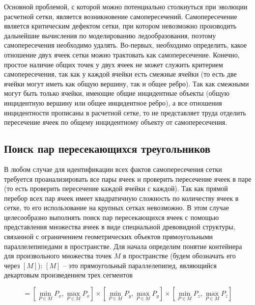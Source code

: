 \documentclass[
11pt,%
tightenlines,%
twoside,%
onecolumn,%
nofloats,%
nobibnotes,%
nofootinbib,%
superscriptaddress,%
noshowpacs,%
centertags]%
{revtex4}
\begin{document}
Основной проблемой, с которой можно потенциально столкнуться при эволюции расчетной сетки, является возникновение самопересечений.
Самопересечение является критическим дефектом сетки, при котором невозможно производить дальнейшие вычисления по моделированию ледообразования, поэтому самопересечения необходимо удалять.
Во-первых, необходимо определить, какое отношение двух ячеек сетки можно трактовать как самопересечение.
Конечно, простое наличие общих точек у двух ячеек не может служить критерием самопересечения, так как у каждой ячейки есть смежные ячейки (то есть две ячейки могут иметь как общую вершину, так и общее ребро).
Так как смежными могут быть только ячейки, имеющие общие инцидентные объекты (общую инцидентную вершину или общее инцидентное ребро), а все отношения инцидентности прописаны в расчетной сетке, то не представляет труда отделить пересечение ячеек по общему инцидентному объекту от самопересечения.

\subsection{Поиск пар пересекающихся треугольников}

В любом случае для идентификации всех фактов самопересечения сетки требуется проанализировать все пары ячеек и проверить пересечение ячеек в паре (то есть проверить пересечение каждой ячейки с каждой).
Так как прямой перебор всех пар ячеек имеет квадратичную сложность по количеству ячеек в сетке, то его использование на крупных сетках невозможно.
В этом случае целесообразно выполнять поиск пар пересекающихся ячеек с помощью представления множества ячеек в виде специальной древовидной структуры, связанной с ограничением геометрических объектов прямоугольными параллелепипедами в пространстве.
Для начала определим понятие контейнера для произвольного множества точек $M$ в пространстве (будем обозначать его через $[M]$): $[M]$ -- это прямоугольный параллелепипед, являющийся декартовым произведением трех сегментов

\begin{equation}
[M] = \left[\min_{P \in M}{P_x}, \max_{P \in M}{P_x}\right]
      \times \left[\min_{P \in M}{P_y}, \max_{P \in M}{P_y}\right]
      \times \left[\min_{P \in M}{P_z}, \max_{P \in M}{P_z}\right]
\end{equation}
\end{document}
